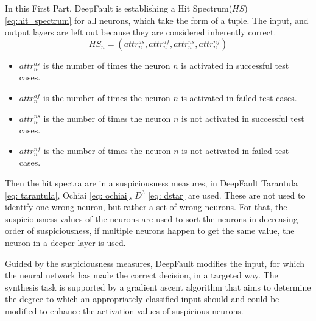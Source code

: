 In this First Part, DeepFault is establishing a Hit Spectrum($HS$) \ref{eq:hit_spectrum} for all neurons, which take the form of a tuple.
The input, and output layers are left out because they are considered inherently correct.
\begin{equation}
    HS_n = (attr_n^{as}, attr_n^{af}, attr_n^{ns}, attr_n^{nf})\label{eq:hit_spectrum}
\end{equation}
\begin{itemize}
    \item $attr^{as}_n$ is the number of times the neuron $n$ is activated in successful test cases.
    \item $attr^{af}_n$ is the number of times the neuron $n$ is activated in failed test cases.
    \item $attr^{ns}_n$ is the number of times the neuron $n$ is not activated in successful test cases.
    \item $attr^{nf}_n$ is the number of times the neuron $n$ is not activated in failed test cases.
\end{itemize}
Then the hit spectra are in a suspiciousness measures, in DeepFault Tarantula \ref{eq: tarantula}, Ochiai \ref{eq: ochiai}, $D^3$ \ref{eq: dstar} are used.
These are not used to identify one wrong neuron, but rather a set of wrong neurons.
For that, the suspiciousness values of the neurons are used to sort the neurons in decreasing order of suspiciousness, if multiple neurons happen to get the same value, the neuron in a deeper layer is used.

Guided by the suspiciousness measures, DeepFault modifies the input, for which the neural network has made the correct decision, in a targeted way.
The synthesis task is supported by a gradient ascent algorithm that aims to determine the degree to which an appropriately classified input should and could be modified to enhance the activation values of suspicious neurons.